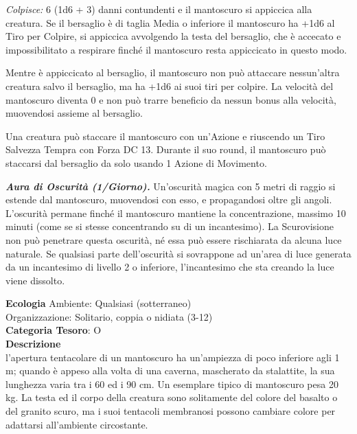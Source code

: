 \begin{multicols}{2}
{\emph{Colpisce:} 6 (1d6 + 3) danni contundenti e il mantoscuro si appiccica alla creatura. Se il bersaglio è di taglia Media o inferiore il mantoscuro ha +1d6 al Tiro per Colpire, si appiccica avvolgendo la testa del bersaglio, che è accecato e impossibilitato a respirare finché il mantoscuro resta appiccicato in questo modo.

Mentre è appiccicato al bersaglio, il mantoscuro non può attaccare nessun'altra creatura salvo il bersaglio, ma ha +1d6 ai suoi tiri per colpire. La velocità del mantoscuro diventa 0 e non può trarre beneficio da nessun bonus alla velocità, muovendosi assieme al bersaglio.

Una creatura può staccare il mantoscuro con un'Azione e riuscendo un Tiro Salvezza Tempra con Forza DC 13. Durante il suo round, il mantoscuro può staccarsi dal bersaglio da solo usando 1 Azione di Movimento.

\emph{\textbf{Aura di Oscurità (1/Giorno).}} Un'oscurità magica con 5 metri di raggio si estende dal mantoscuro, muovendosi con esso, e propagandosi oltre gli angoli. L'oscurità permane finché il mantoscuro mantiene la concentrazione, massimo 10 minuti (come se si stesse concentrando su di un incantesimo). La Scurovisione non può penetrare questa oscurità, né essa può essere rischiarata da alcuna luce naturale. Se qualsiasi parte dell'oscurità si sovrappone ad un'area di luce generata da un incantesimo di livello 2 o inferiore, l'incantesimo che sta creando la luce viene dissolto.

\textbf{Ecologia}
Ambiente: Qualsiasi (sotterraneo)\\
Organizzazione: Solitario, coppia o nidiata (3-12)\\
\textbf{Categoria Tesoro}: O\\
\textbf{Descrizione}\\
l'apertura tentacolare di un mantoscuro ha un'ampiezza di poco inferiore agli 1 m; quando è appeso alla volta di una caverna, mascherato da stalattite, la sua lunghezza varia tra i 60 ed i 90 cm. Un esemplare tipico di mantoscuro pesa 20 kg. La testa ed il corpo della creatura sono solitamente del colore del basalto o del granito scuro, ma i suoi tentacoli membranosi possono cambiare colore per adattarsi all'ambiente circostante.

}
\end{multicols}
